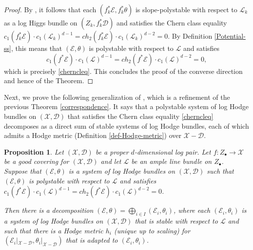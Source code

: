 \documentclass[a4paper]{amsart}
\newtheorem{proposition}[theorem]{Proposition}
\theoremstyle{definition}
\begin{document}
\begin{proof}
By \cite[Propositions 5.1-5.3]{mochizuki_asterisque}, it follows that each $(f_k^*\mathcal{E},f_k^*\theta)$ is slope-polystable with respect to $\mathcal{L}_k$ as a log Higgs bundle on $(Z_k,f_k^*\mathscr{D})$ and satisfies the Chern class equality $c_1(f_k^*\mathcal{E})\cdot c_1(\mathcal{L}_k)^{d-1}=ch_2(f_k^*\mathcal{E})\cdot c_1(\mathcal{L}_k)^{d-2}=0$. By Definition \ref{Potential-ss}, this means that $(\mathcal{E},\theta)$ is polystable with respect to $\mathcal{L}$ and satisfies 
\[
c_1(f^*\mathcal{E})\cdot c_1(\mathcal{L})^{d-1}=ch_2(f^*\mathcal{E})\cdot c_1(\mathcal{L})^{d-2}=0, 
\]
which is precisely \ref{cherncleq}. This concludes the proof of the converse direction and hence of the Theorem.
\end{proof}

Next, we prove the following generalization of \cite[Proposition 2.12]{dengcadorel}, which is a refinement of the previous Theorem \ref{correspondence}. It says that a polystable system of log Hodge bundles on $(\mathscr{X},\mathscr{D})$ that satisfies the Chern class equality \ref{cherncleq} decomposes as a direct sum of stable systems of log Hodge bundles, each of which admits a Hodge metric (Definition \ref{def-Hodge-metric}) over $\mathscr{X}-\mathscr{D}$.


\begin{proposition}\label{Hodge-metric}
Let $(\mathscr{X},\mathscr{D})$ be a proper $d$-dimensional log pair. Let $f:Z_\bullet\to\mathscr{X}$ be a good covering for $(\mathscr{X},\mathscr{D})$ and let $\mathcal{L}$ be an ample line bundle on $Z_\bullet$. Suppose that $(\mathcal{E},\theta)$ is a system of log Hodge bundles on $(\mathscr{X},\mathscr{D})$ such that $(\mathcal{E},\theta)$ is polystable with respect to $\mathcal{L}$ and satisfies $c_1(f^*\mathcal{E})\cdot c_1(\mathcal{L})^{d-1}=ch_2(f^*\mathcal{E})\cdot c_1(\mathcal{L})^{d-2}=0$. 

Then there is a decomposition $(\mathcal{E},\theta)=\bigoplus_{i\in I}(\mathcal{E}_i,\theta_i)$, where each $(\mathcal{E}_i,\theta_i)$ is a system of log Hodge bundles on $(\mathscr{X},\mathscr{D})$ that is stable with respect to $\mathcal{L}$ and such that there is a Hodge metric $h_i$ (unique up to scaling) for $(\mathcal{E}_i|_{\mathscr{X}-\mathscr{D}},\theta_i|_{\mathscr{X}-\mathscr{D}})$ that is adapted to $(\mathcal{E}_i,\theta_i)$.
\end{proposition}
\end{document}
